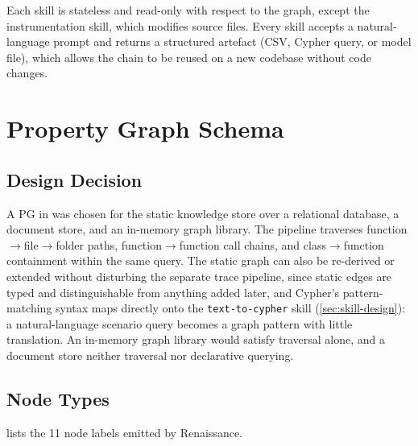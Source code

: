 Each skill is stateless and read-only with respect to the graph, except
the instrumentation skill, which modifies source files. Every skill
accepts a natural-language prompt and returns a structured artefact (CSV,
Cypher query, or model file), which allows the chain to be reused on a
new codebase without code changes.

\section{Property Graph Schema}\label{sec:pg-schema}

\subsection{Design Decision}\label{sec:pg-decision}

A \ac{PG} in \neo was chosen for the static knowledge store over a
relational database, a document store, and an in-memory graph library.
The pipeline traverses function$\to$file$\to$folder paths,
function$\to$function call chains, and class$\to$function containment
within the same query. The static graph can also be re-derived or extended without disturbing
the separate trace pipeline, since static edges are typed and
distinguishable from anything added later, and Cypher's pattern-matching
syntax maps directly onto the \texttt{text-to-cypher} skill
(\cref{sec:skill-design}): a natural-language scenario query becomes a
graph pattern with little translation. An in-memory graph library would
satisfy traversal alone, and a document store neither traversal nor
declarative querying.

\subsection{Node Types}\label{sec:node-types}

 lists the 11 node labels emitted by Renaissance.

